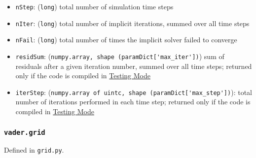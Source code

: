 \documentclass[12pt]{article}
\begin{document}
\begin{itemize}
\item \texttt{nStep}: (\texttt{long}) total number of simulation time steps
\item \texttt{nIter}: (\texttt{long}) total number of implicit iterations, summed over all time steps
\item \texttt{nFail}: (\texttt{long}) total number of times the implicit solver failed to converge
\item \texttt{residSum}: (\verb=numpy.array, shape (paramDict['max_iter'])=) sum of residuals after a given iteration number, summed over
all time steps; returned only if the code is compiled in \hyperref[ssec:testingMode]{Testing Mode}
\item \texttt{iterStep}: (\verb=numpy.array of uintc, shape (paramDict['max_step'])=): total number of iterations performed in each time step; returned only if the code is compiled in \hyperref[ssec:testingMode]{Testing Mode}
\end{itemize}

\subsubsection{\texttt{vader.grid}}
\label{sssec:vader.grid}

Defined in \verb=grid.py=.
\end{document}
